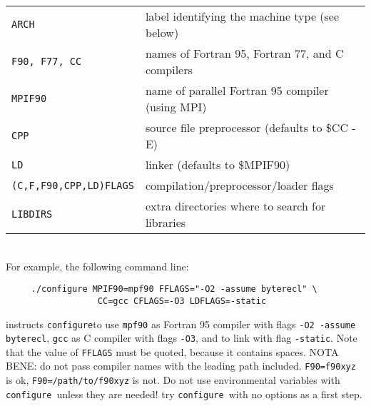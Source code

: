 \documentclass[12pt,a4paper]{article}
\def\configure{\texttt{configure}}
\begin{document}
\begin{tabular}{ll}
\texttt{ARCH}& label identifying the machine type (see below)\\
\texttt{F90, F77, CC} &names of Fortran 95, Fortran 77, and C compilers\\
\texttt{MPIF90} &       name of parallel Fortran 95 compiler (using MPI)\\
\texttt{CPP} &          source file preprocessor (defaults to \$CC -E)\\
\texttt{LD} &           linker (defaults to \$MPIF90)\\
\texttt{(C,F,F90,CPP,LD)FLAGS}& compilation/preprocessor/loader flags\\
\texttt{LIBDIRS}&     extra directories where to search for libraries\\
\end{tabular}\\
For example, the following command line:
\begin{verbatim}
     ./configure MPIF90=mpf90 FFLAGS="-O2 -assume byterecl" \
                  CC=gcc CFLAGS=-O3 LDFLAGS=-static
\end{verbatim}
instructs \configure to use \texttt{mpf90} as Fortran 95 compiler 
with flags \texttt{-O2 -assume byterecl}, \texttt{gcc} as C compiler with 
flags \texttt{-O3}, and to link with flag \texttt{-static}. 
Note that the value of \texttt{FFLAGS} must be quoted, because it contains
spaces. NOTA BENE: do not pass compiler names with the leading path
included. \texttt{F90=f90xyz} is ok, \texttt{F90=/path/to/f90xyz} is not. 
Do not use
environmental variables with \configure\ unless they are needed! try
\configure\ with no options as a first step.
\end{document}
